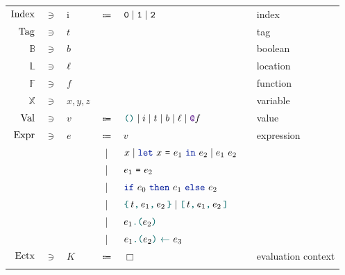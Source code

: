 \begin{figure}[tp]
    \begin{tabular}{rclclcl}
            $\mathrm{Index}$
            & $\ni$ &
            i
            & $\Coloneqq$ &
            $\texttt{0} \mid \texttt{1} \mid \texttt{2}$
            &&
            index
        \\
            $\mathrm{Tag}$
            & $\ni$ &
            $t$
            &&
            &&
            tag
        \\
            $\mathbb{B}$
            & $\ni$ &
            $b$
            &&
            &&
            boolean
    	\\
    		$\mathbb{L}$
    		& $\ni$ &
    		$\ell$
    		&&
    		&&
    		location
        \\
            $\mathbb{F}$
            & $\ni$ &
            $f$
            &&
            &&
            function
        \\
            $\mathbb{X}$
            & $\ni$ &
            $x, y, z$
            &&
            &&
            variable
    	\\
            $\mathrm{Val}$
            & $\ni$ &
            $v$
            & $\Coloneqq$ &
            $\lambdUnit \mid i \mid t \mid b \mid \ell \mid \lambdFunc{f}$
            &&
            value
        \\
            $\mathrm{Expr}$
            & $\ni$ &
            $e$
            & $\Coloneqq$ &
            $v$
            &&
            expression
        \\
            &&
            & | &
            $x \mid \lambdLet{x}{e_1}{e_2} \mid \lambdCall{e_1}{e_2}$
        \\
            &&
            & | &
            $e_1\ \texttt{=}\ e_2$
        \\
            &&
            & | &
            $\lambdIf{e_0}{e_1}{e_2}$
        \\
            &&
            & | &
            $\lambdConstr{t}{e_1}{e_2} \mid \lambdConstrDet{t}{e_1}{e_2}$
        \\
            &&
            & | &
            $\lambdLoad{e_1}{e_2}$
        \\
            &&
            & | &
            $\lambdStore{e_1}{e_2}{e_3}$
        \\
            $\mathrm{Ectx}$
            & $\ni$ &
            $K$
            & $\Coloneqq$ &
            $\Box$
            &&
            evaluation context
        \\
            &&

\end{tabular}
\end{figure}
